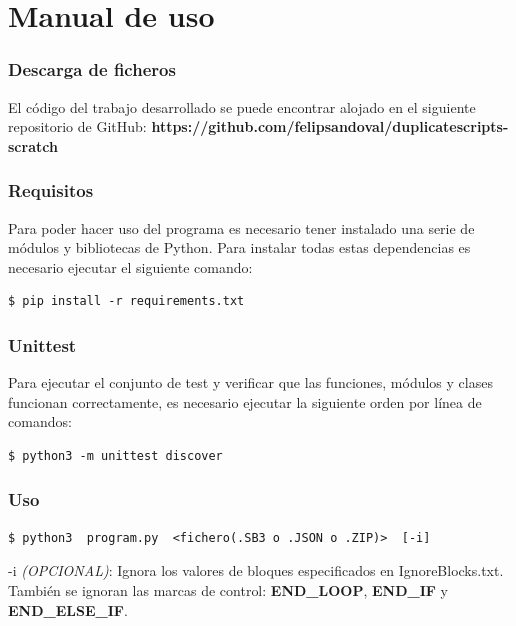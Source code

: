 \documentclass[a4paper, 12pt]{book}
\begin{document}

\cleardoublepage
\appendix

\chapter{Manual de uso}
\label{app:manual}


\subsection{Descarga de ficheros}
El código del trabajo desarrollado se puede encontrar alojado en el siguiente repositorio de GitHub: \textbf{https://github.com/felipsandoval/duplicatescripts-scratch}

\subsection{Requisitos}

Para poder hacer uso del programa es necesario tener instalado una serie de módulos y bibliotecas de Python. Para instalar todas estas dependencias es necesario ejecutar el siguiente comando:

\begin{lstlisting}[style=consola,numbers=none]
$ pip install -r requirements.txt
\end{lstlisting}

\subsection{Unittest}

Para ejecutar el conjunto de test y verificar que las funciones, módulos y clases funcionan correctamente, es necesario ejecutar la siguiente orden por línea de comandos:

\begin{lstlisting}[style=consola,numbers=none]
$ python3 -m unittest discover
\end{lstlisting}

\newpage 

\subsection{Uso}

\begin{lstlisting}[style=consola,numbers=none]
$ python3  program.py  <fichero(.SB3 o .JSON o .ZIP)>  [-i]
\end{lstlisting}

-i \textit{(OPCIONAL)}: Ignora los valores de bloques especificados en IgnoreBlocks.txt. También se ignoran las marcas de control: \textbf{END\_LOOP}, \textbf{END\_IF} y \textbf{END\_ELSE\_IF}.
\end{document}
